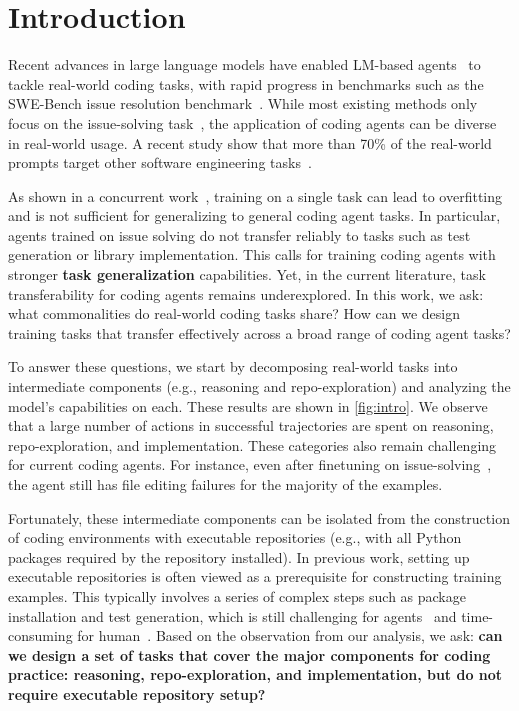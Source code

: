 \section{Introduction}

Recent advances in large language models have enabled LM-based agents~\citep{sweagent,openhands} to tackle real-world coding tasks, with rapid progress in benchmarks such as the SWE-Bench issue resolution benchmark~\citep{swebench}.
While most existing methods only focus on the issue-solving task~\citep{swegym,R2EGym,swe-smith}, the application of coding agents can be diverse in real-world usage. A recent study show that more than 70\% of the real-world prompts target other software engineering tasks~\citep{valerie-interaction}.

As shown in a concurrent work~\citep{swe-play}, training on a single task can lead to overfitting and is not sufficient for generalizing to general coding agent tasks.
In particular, agents trained on issue solving do not transfer reliably to tasks such as test generation or library implementation. This calls for training coding agents with stronger \textbf{task generalization} capabilities.
Yet, in the current literature, task transferability for coding agents remains underexplored. 
In this work, we ask: what commonalities do real-world coding tasks share? How can we design training tasks that transfer effectively across a broad range of coding agent tasks?

To answer these questions, we start by decomposing real-world tasks into intermediate components (e.g., reasoning and repo-exploration) and analyzing the model's capabilities on each.
These results are shown in \autoref{fig:intro}.
We observe that a large number of actions in successful trajectories are spent on reasoning, repo-exploration, and implementation.
These categories also remain challenging for current coding agents.
For instance, even after finetuning on issue-solving~\cite{swegym}, the agent still has file editing failures for the majority of the examples.

Fortunately, these intermediate components can be isolated from the construction of coding environments with executable repositories (e.g., with all Python packages required by the repository installed).
In previous work, setting up executable repositories is often viewed as a prerequisite for constructing training examples. This typically involves a series of complex steps such as package installation and test generation, which is still challenging for agents~\cite{swe-play} and time-consuming for human~\cite{swegym,swe-smith,R2EGym}.
Based on the observation from our analysis, we ask: \textbf{can we design a set of tasks that cover the major components for coding practice: reasoning, repo-exploration, and implementation, but do not require executable repository setup?}


